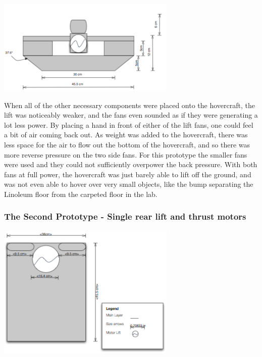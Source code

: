 \begin{minipage}{6.5in}
\begin{center}
  \includegraphics[width=85mm]{imageSources/SideView2.png}
\end{center}
\label{Side2}
\end{minipage}

When all of the other necessary components were placed onto the hovercraft, the lift was noticeably weaker, and the fans
even sounded as if they were generating a lot less power. By placing a hand in front of either of the lift fans, one could feel
a bit of air coming back out. As weight was added to the hovercraft, there was less space for the air to flow out the bottom
of the hovercraft, and so there was more reverse pressure on the two side fans. For this prototype the smaller fans were used
and they could not sufficiently overpower the back pressure. With both fans at full power, the hovercraft was just barely able
to lift off the ground, and was not even able to hover over very small objects, like the bump separating the Linoleum floor
from the carpeted floor in the lab. 

\subsubsection{The Second Prototype - Single rear lift and thrust motors}

\begin{minipage}{6.5in}
\begin{center}
  \includegraphics[width=85mm]{imageSources/Topfinal.png}
\end{center}
\label{finaltop}
\end{minipage}

